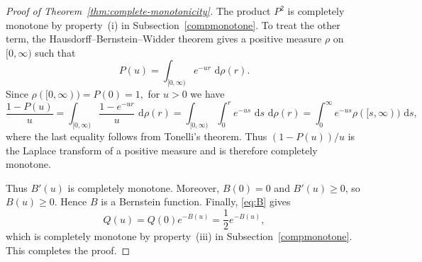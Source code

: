 \documentclass[10pt,a4paper]{amsart}
\newcommand{\dd}{\,\mathrm d}
\begin{document}
\begin{proof}[Proof of Theorem~\ref{thm:complete-monotonicity}]
The product $P^2$ is completely monotone by property~(i) in
Subsection~\ref{compmonotone}.  To treat the other term, the
Hausdorff--Bernstein--Widder theorem gives a positive measure $\rho$
on $[0,\infty)$ such that
\[
 P(u)=\int_{[0,\infty)}e^{-ur}\,\dd\rho(r).
\]
Since
$
 \rho([0,\infty))=P(0)=1,
$
for $u>0$ we have
$$
 \frac{1-P(u)}u
 =
 \int_{[0,\infty)}\frac{1-e^{-ur}}u\,\dd\rho(r) =
 \int_{[0,\infty)}\int_0^r e^{-us}\,\dd s\,\dd\rho(r)=
 \int_0^\infty e^{-us}\rho([s,\infty))\,\dd s,
$$
where the last equality follows from Tonelli's theorem.  Thus
$(1-P(u))/u$ is the Laplace transform of a positive measure and is
therefore completely monotone.

Thus $B'(u)$ is completely monotone.  Moreover, $B(0)=0$ and $B'(u)\geq0$, so
$B(u)\geq0$.  Hence $B$ is a Bernstein function.  Finally,
\eqref{eq:B} gives
\[
 Q(u)=Q(0)e^{-B(u)}=\frac12e^{-B(u)},
\]
which is completely monotone by property~(iii) in
Subsection~\ref{compmonotone}.  This completes the proof.
\end{proof}
\end{document}
